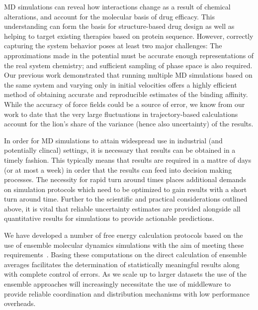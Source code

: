 MD simulations can reveal how interactions change as a result of chemical alterations,
and account for the molecular basis of drug efficacy. 
This understanding can form the basis for structure-based drug design as well as helping 
to target existing therapies based on protein sequence. 
However, correctly capturing the system behavior poses at least two major 
challenges: The approximations made in the potential must be accurate enough representations 
of the real system chemistry; and sufficient sampling of phase space is also required.
Our previous work demonstrated \cite{Sadiq2010, Wan2011} that running multiple 
MD simulations based on the same system and varying only in initial velocities
offers a highly efficient method of obtaining accurate and reproducible
estimates of the binding affinity.
While the accuracy of force fields could be a source of error, we know from our work to 
date that the very large fluctuations in trajectory-based calculations account for the lion’s 
share of the variance (hence also uncertainty) of the results.

In order for MD simulations to attain widespread use in industrial (and potentially 
clincal) settings, it is necessary that results can be obtained in a timely fashion.
This typically means that results are required in a mattre of days (or at most a week) 
in order that the results can feed into decision making processes.
The necessity for rapid turn around times places additional demands on
simulation protocols which need to be optimized to gain results with a short
turn around time. 
Further to the scientific and practical considerations
outlined above, it is vital that reliable uncertainty estimates are
provided alongside all quantitative results for simulations to provide
actionable predictions.

We have developed a number of free energy calculation protocols based on the
use of ensemble molecular dynamics simulations with the aim of meeting these
requirements~\cite{Sadiq2008, Sadiq2010, Wan2017brd4, Wan2017trk}.
Basing these computations on the direct calculation of ensemble averages facilitates
the determination of statistically meaningful results along with complete
control of errors. 
As we scale up to larger datasets the use of the ensemble approaches will increasingly 
necessitate the use of middleware to  provide reliable coordination and distribution 
mechanisms with low performance overheads.

